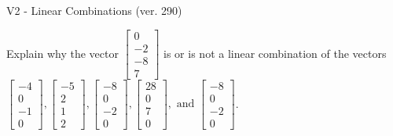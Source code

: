 \begin{exercise}
  \begin{exerciseTitle}V2 - Linear Combinations (ver. 290)\end{exerciseTitle}
  \begin{exerciseStatement}
    Explain why the vector \(\left[\begin{array}{c}
0 \\
-2 \\
-8 \\
7
\end{array}\right]\)  is or is not a linear 
	combination of the vectors \(\left[\begin{array}{c}
-4 \\
0 \\
-1 \\
0
\end{array}\right] , \left[\begin{array}{c}
-5 \\
2 \\
1 \\
2
\end{array}\right] , \left[\begin{array}{c}
-8 \\
0 \\
-2 \\
0
\end{array}\right] , \left[\begin{array}{c}
28 \\
0 \\
7 \\
0
\end{array}\right] , \text{ and } \left[\begin{array}{c}
-8 \\
0 \\
-2 \\
0
\end{array}\right]\).
	



\end{exerciseStatement}
\end{exercise}
